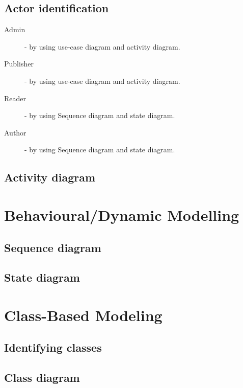 	\subsection{Actor identification}

	\begin{description}
		\item[Admin] - by using use-case diagram and activity diagram.
		\item[Publisher] - by using use-case diagram and activity diagram.
		\item[Reader] - by using Sequence diagram and state diagram.
		\item[Author] - by using Sequence diagram and state diagram.
	\end{description}

	

	

	\subsection{Activity diagram}



\section{Behavioural/Dynamic Modelling}
	\subsection{Sequence diagram}
	\subsection{State diagram}

\section{Class-Based Modeling}
	\subsection{Identifying classes}
	\subsection{Class diagram}
